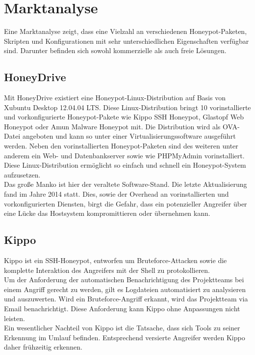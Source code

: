 \chapter{Marktanalyse}
\label{ch:Marktanalyse}

Eine Marktanalyse zeigt, dass eine Vielzahl an verschiedenen Honeypot-Paketen, Skripten und Konfigurationen mit sehr unterschiedlichen Eigenschaften verfügbar sind. Darunter befinden sich sowohl kommerzielle als auch freie Lösungen.

\section{HoneyDrive}
\label{sec:HoneyDrive}
Mit HoneyDrive existiert eine Honeypot-Linux-Distribution auf Basis von Xubuntu Desktop 12.04.04 LTS. Diese Linux-Distribution bringt 10 vorinstallierte und vorkonfigurierte Honeypot-Pakete wie Kippo SSH Honeypot, Glastopf Web Honeypot oder Amun Malware Honeypot mit. Die Distribution wird als OVA-Datei angeboten und kann so unter einer Virtualisierungssoftware ausgeführt werden. Neben den vorinstallierten Honeypot-Paketen sind des weiteren unter anderem ein Web- und Datenbankserver sowie wie PHPMyAdmin vorinstalliert.
Diese Linux-Distribution ermöglicht so einfach und schnell ein Honeypot-System aufzusetzen.\\

Das große Manko ist hier der veraltete Software-Stand. Die letzte Aktualisierung fand im Jahre 2014 statt. Dies, sowie der Overhead an vorinstallierten und vorkonfigurierten Diensten, birgt die Gefahr, dass ein potenzieller Angreifer über eine Lücke das Hostsystem kompromittieren oder übernehmen kann.

\section{Kippo}
\label{sec:Kippo}
Kippo ist ein SSH-Honeypot, entworfen um Bruteforce-Attacken sowie die komplette Interaktion des Angreifers mit der Shell zu protokollieren.\\
Um der Anforderung der automatischen Benachrichtigung des Projektteams bei einem Angriff gerecht zu werden, gilt es Logdateien automatisiert zu analysieren und auszuwerten. Wird ein Bruteforce-Angriff erkannt, wird das Projektteam via Email benachrichtigt. Diese Anforderung kann Kippo ohne Anpassungen nicht leisten.\\

Ein wesentlicher Nachteil von Kippo ist die Tatsache, dass sich Tools zu seiner Erkennung im Umlauf befinden. Entsprechend versierte Angreifer werden Kippo daher frühzeitig erkennen.


